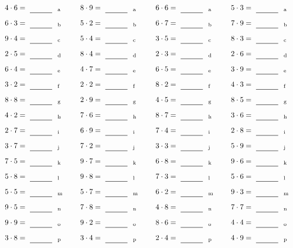 \documentclass
[
  draft    = true,
  fontsize = 11pt,
  parskip  = half-
]
{scrartcl}
\begin{document}
\par\vfill\par
\begin{align*}
    \pline{4\cdot6}&=\rline{a}
  & \pline{8\cdot9}&=\rline{a}
  & \pline{6\cdot6}&=\rline{a}
  & \pline{5\cdot3}&=\rline{a} \\[1ex]
    \pline{6\cdot3}&=\rline{b}
  & \pline{5\cdot2}&=\rline{b}
  & \pline{6\cdot7}&=\rline{b}
  & \pline{7\cdot9}&=\rline{b} \\[1ex]
    \pline{9\cdot4}&=\rline{c}
  & \pline{5\cdot4}&=\rline{c}
  & \pline{3\cdot5}&=\rline{c}
  & \pline{8\cdot3}&=\rline{c} \\[1ex]
    \pline{2\cdot5}&=\rline{d}
  & \pline{8\cdot4}&=\rline{d}
  & \pline{2\cdot3}&=\rline{d}
  & \pline{2\cdot6}&=\rline{d} \\[1ex]
    \pline{6\cdot4}&=\rline{e}
  & \pline{4\cdot7}&=\rline{e}
  & \pline{6\cdot5}&=\rline{e}
  & \pline{3\cdot9}&=\rline{e} \\[1ex]
    \pline{3\cdot2}&=\rline{f}
  & \pline{2\cdot2}&=\rline{f}
  & \pline{8\cdot2}&=\rline{f}
  & \pline{4\cdot3}&=\rline{f} \\[1ex]
    \pline{8\cdot8}&=\rline{g}
  & \pline{2\cdot9}&=\rline{g}
  & \pline{4\cdot5}&=\rline{g}
  & \pline{8\cdot5}&=\rline{g} \\[1ex]
    \pline{4\cdot2}&=\rline{h}
  & \pline{7\cdot6}&=\rline{h}
  & \pline{8\cdot7}&=\rline{h}
  & \pline{3\cdot6}&=\rline{h} \\[1ex]
    \pline{2\cdot7}&=\rline{i}
  & \pline{6\cdot9}&=\rline{i}
  & \pline{7\cdot4}&=\rline{i}
  & \pline{2\cdot8}&=\rline{i} \\[1ex]
    \pline{3\cdot7}&=\rline{j}
  & \pline{7\cdot2}&=\rline{j}
  & \pline{3\cdot3}&=\rline{j}
  & \pline{5\cdot9}&=\rline{j} \\[1ex]
    \pline{7\cdot5}&=\rline{k}
  & \pline{9\cdot7}&=\rline{k}
  & \pline{6\cdot8}&=\rline{k}
  & \pline{9\cdot6}&=\rline{k} \\[1ex]
    \pline{5\cdot8}&=\rline{l}
  & \pline{9\cdot8}&=\rline{l}
  & \pline{7\cdot3}&=\rline{l}
  & \pline{5\cdot6}&=\rline{l} \\[1ex]
    \pline{5\cdot5}&=\rline{m}
  & \pline{5\cdot7}&=\rline{m}
  & \pline{6\cdot2}&=\rline{m}
  & \pline{9\cdot3}&=\rline{m} \\[1ex]
    \pline{9\cdot5}&=\rline{n}
  & \pline{7\cdot8}&=\rline{n}
  & \pline{4\cdot8}&=\rline{n}
  & \pline{7\cdot7}&=\rline{n} \\[1ex]
    \pline{9\cdot9}&=\rline{o}
  & \pline{9\cdot2}&=\rline{o}
  & \pline{8\cdot6}&=\rline{o}
  & \pline{4\cdot4}&=\rline{o} \\[1ex]
    \pline{3\cdot8}&=\rline{p}
  & \pline{3\cdot4}&=\rline{p}
  & \pline{2\cdot4}&=\rline{p}
  & \pline{4\cdot9}&=\rline{p}
\end{align*}
\end{document}

